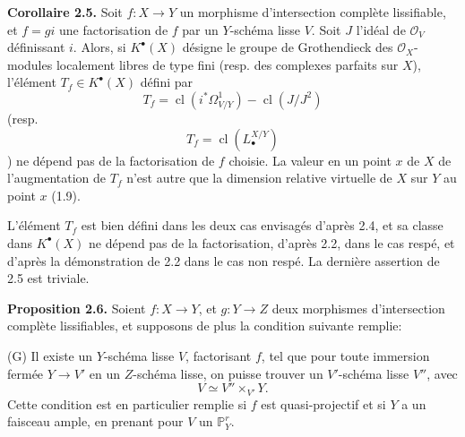 \documentclass[11pt]{article}
\begin{document}
\textbf{Corollaire 2.5.} Soit $f:X\to Y$ un morphisme d'intersection complète lissifiable, et $f=gi$ une factorisation de $f$ par un $Y$-schéma lisse $V$. Soit $J$ l'idéal de $\mathcal O_V$ définissant $i$. Alors, si $K^{\bullet}(X)$ désigne le groupe de Grothendieck des $\mathcal O_X$-modules localement libres de type fini (resp. des complexes parfaits sur $X$), l'élément $T_f\in K^{\bullet}(X)$ défini par
\[
T_f=\operatorname{cl}(i^*\Omega^1_{V/Y})-\operatorname{cl}(J/J^2)
\]
(resp.
\[
T_f=\operatorname{cl}(L^{X/Y}_\bullet)
\]
)
ne dépend pas de la factorisation de $f$ choisie. La valeur en un point $x$ de $X$ de l'augmentation de $T_f$ n'est autre que la dimension relative virtuelle de $X$ sur $Y$ au point $x$ (1.9).

L'élément $T_f$ est bien défini dans les deux cas envisagés d'après 2.4, et sa classe dans $K^{\bullet}(X)$ ne dépend pas de la factorisation, d'après 2.2, dans le cas respé, et d'après la démonstration de 2.2 dans le cas non respé. La dernière assertion de 2.5 est triviale.

\textbf{Proposition 2.6.} Soient $f:X\to Y$, et $g:Y\to Z$ deux morphismes d'intersection complète lissifiables, et supposons de plus la condition suivante remplie:

(G) Il existe un $Y$-schéma lisse $V$, factorisant $f$, tel que pour toute immersion fermée $Y\to V'$ en un $Z$-schéma lisse, on puisse trouver un $V'$-schéma lisse $V''$, avec
\[
V\simeq V''\times_{V'}Y.
\]
Cette condition est en particulier remplie si $f$ est quasi-projectif et si $Y$ a un faisceau ample, en prenant pour $V$ un $\mathbb P^r_Y$.
\end{document}
